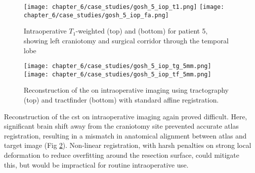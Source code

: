 \begin{figure}[htb!]
  \centering
  \texttt{[image: chapter\_6/case\_studies/gosh\_5\_iop\_t1.png]}
  \texttt{[image: chapter\_6/case\_studies/gosh\_5\_iop\_fa.png]}
  \caption[GOSH iMRI patient 5, intraoperative imaging]{Intraoperative $T_1$-weighted (top) and   (bottom) for patient 5, showing left craniotomy and surgical corridor through the temporal lobe}
  \label{fig:5i}
\end{figure}

\begin{figure}[htb!]
  \centering
  \texttt{[image: chapter\_6/case\_studies/gosh\_5\_iop\_tg\_5mm.png]}
  \texttt{[image: chapter\_6/case\_studies/gosh\_5\_iop\_tf\_5mm.png]}
  \caption[GOSH iMRI patient 5, intraoperative imaging, corticospinal tract reconstruction]{Reconstruction of the  on intraoperative imaging using tractography (top) and tractfinder (bottom) with standard affine registration.}
  \label{fig:5i_cst}
\end{figure}

Reconstruction of the \gls{cst} on intraoperative imaging again proved difficult.
Here, significant brain shift away from the craniotomy site prevented accurate atlas registration, resulting in a mismatch in anatomical alignment between atlas and target image (Fig \ref{fig:5i_cst}).
Non-linear registration, with harsh penalties on strong local deformation to reduce overfitting around the resection surface, could mitigate this, but would be impractical for routine intraoperative use.
